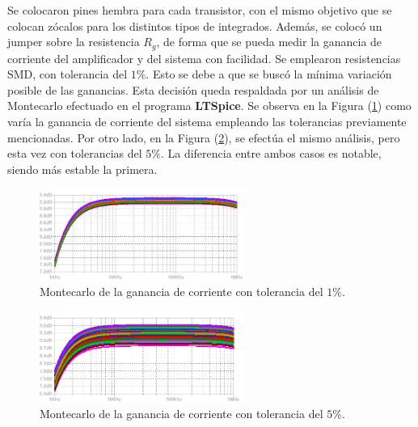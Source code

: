 Se colocaron pines hembra para cada transistor, con el mismo objetivo que se colocan zócalos para los distintos tipos de integrados. Además, se colocó un jumper sobre la resistencia $R_g$, de forma que se pueda medir la ganancia de corriente del amplificador y del sistema  con facilidad. Se emplearon resistencias SMD, con tolerancia del $1\%$. Esto se debe a que se buscó la mínima variación posible de las ganancias. Esta decisión queda respaldada por un análisis de Montecarlo efectuado en el programa \textbf{LTSpice}. Se observa en la Figura (\ref{fig:mc-ai1}) como varía la ganancia de corriente del sistema empleando las tolerancias previamente mencionadas. Por otro lado, en la Figura (\ref{fig:mc-ai2}), se efectúa el mismo análisis, pero esta vez con tolerancias del $5\%$. La diferencia entre ambos casos es notable, siendo más estable la primera.
\begin{figure}[H]
\centering
	\includegraphics[width=0.6\textwidth]{Imagenes/MC-Ai.png}
	\caption{Montecarlo de la ganancia de corriente con tolerancia del $1\%$.}
	\label{fig:mc-ai1}
\end{figure}
\begin{figure}[H]
\centering
	\includegraphics[width=0.6\textwidth]{Imagenes/MC-Ai_2.png}
	\caption{Montecarlo de la ganancia de corriente con tolerancia del $5\%$.}
	\label{fig:mc-ai2}
\end{figure}

